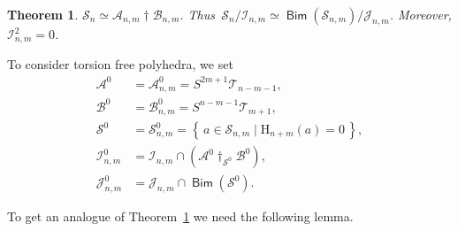 \documentclass[12pt,a4paper]{amsart}
\newtheorem{theorem}{Theorem}[section]
\theoremstyle{definition}
\theoremstyle{remark}
\numberwithin{equation}{section}
\begin{document}
 \begin{theorem}\label{22}
  ${\mathscr S}_n\simeq{\mathscr A}_{n,m}{\dagger}{\mathscr B}_{n,m}$.
 Thus $\,{\mathscr S}_n/{\mathscr I}_{n,m}\simeq{\mathop\mathsf{Bim}\nolimits}({\mathscr S}_{n,m})/{\mathscr J}_{n,m}$.
 Moreover, ${\mathscr I}_{n,m}^2=0$.
 \end{theorem}
 
 To consider torsion free polyhedra, we set
 \begin{equation}\label{e23}
   \begin{split}
     {\mathscr A}^0&={\mathscr A}^0_{n,m}=S^{2m+1}{\mathscr T}_{n-m-1},\\ {\mathscr B}^0&={\mathscr B}^0_{n,m}=S^{n-m-1}{\mathscr T}_{m+1},\\ 
  {\mathscr S}^0&={\mathscr S}^0_{n,m}={\left\{\,{a\in{\mathscr S}_{n,m}}\mid {{\mathrm H}_{n+m}(a)=0}\,\right\}},\\
  {\mathscr I}^0_{n,m}&={\mathscr I}_{n,m}\cap({\mathscr A}^0{\dagger}_{{\mathscr S}^0}{\mathscr B}^0),\\
  {\mathscr J}^0_{n,m}&={\mathscr J}_{n,m}\cap{\mathop\mathsf{Bim}\nolimits}({\mathscr S}^0).
 \end{split}
 \end{equation}

 To get an analogue of Theorem~\ref{22} we need the following lemma.
\end{document}
